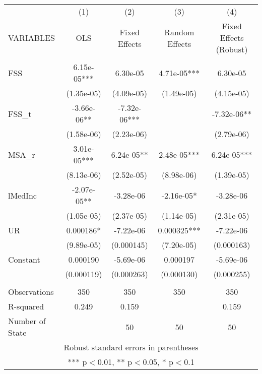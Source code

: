 \documentclass[]{article}
\begin{document}
\begin{tabular}{lcccc} \hline
 & (1) & (2) & (3) & (4) \\
VARIABLES & OLS & Fixed Effects & Random Effects & Fixed Effects (Robust) \\ \hline
 &  &  &  &  \\
FSS & 6.15e-05*** & 6.30e-05 & 4.71e-05*** & 6.30e-05 \\
 & (1.35e-05) & (4.09e-05) & (1.49e-05) & (4.15e-05) \\
FSS\_t & -3.66e-06** & -7.32e-06*** &  & -7.32e-06** \\
 & (1.58e-06) & (2.23e-06) &  & (2.79e-06) \\
MSA\_r & 3.01e-05*** & 6.24e-05** & 2.48e-05*** & 6.24e-05*** \\
 & (8.13e-06) & (2.52e-05) & (8.98e-06) & (1.39e-05) \\
lMedInc & -2.07e-05** & -3.28e-06 & -2.16e-05* & -3.28e-06 \\
 & (1.05e-05) & (2.37e-05) & (1.14e-05) & (2.31e-05) \\
UR & 0.000186* & -7.22e-06 & 0.000325*** & -7.22e-06 \\
 & (9.89e-05) & (0.000145) & (7.20e-05) & (0.000163) \\
Constant & 0.000190 & -5.69e-06 & 0.000197 & -5.69e-06 \\
 & (0.000119) & (0.000263) & (0.000130) & (0.000255) \\
 &  &  &  &  \\
Observations & 350 & 350 & 350 & 350 \\
R-squared & 0.249 & 0.159 &  & 0.159 \\
 Number of State &  & 50 & 50 & 50 \\ \hline
\multicolumn{5}{c}{ Robust standard errors in parentheses} \\
\multicolumn{5}{c}{ *** p$<$0.01, ** p$<$0.05, * p$<$0.1} \\
\end{tabular}
\end{document}
